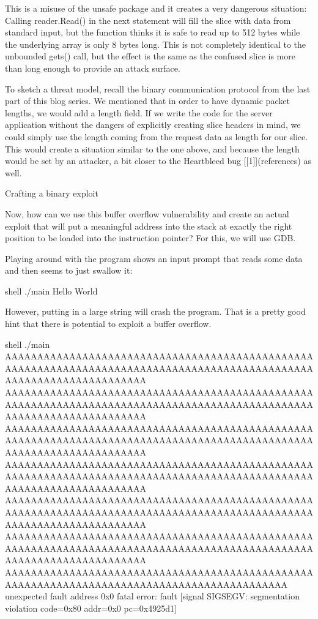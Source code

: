 This is a misuse of the unsafe package and it creates a very dangerous situation: Calling reader.Read() in the next
statement will fill the slice with data from standard input, but the function thinks it is safe to read up to 512 bytes
while the underlying array is only 8 bytes long. This is not completely identical to the unbounded gets() call,
but the effect is the same as the confused slice is more than long enough to provide an attack surface.

To sketch a threat model, recall the binary communication protocol from the last part of this blog series. We mentioned
that in order to have dynamic packet lengths, we would add a length field. If we write the code for the server application
without the dangers of explicitly creating slice headers in mind, we could simply use the length coming from the request
data as length for our slice. This would create a situation similar to the one above, and because the length would be
set by an attacker, a bit closer to the Heartbleed bug [[1]](references) as well.


Crafting a binary exploit

Now, how can we use this buffer overflow vulnerability and create an actual exploit that will put a meaningful address
into the stack at exactly the right position to be loaded into the instruction pointer? For this, we will use GDB.

Playing around with the program shows an input prompt that reads some data and then seems to just swallow it:

shell
./main
Hello World



However, putting in a large string will crash the program. That is a pretty good hint that there is potential to
exploit a buffer overflow.

shell
./main
AAAAAAAAAAAAAAAAAAAAAAAAAAAAAAAAAAAAAAAAAAAAAAAAAAAAAAAAAAAAAAAAAAAAAAAAAAAAAAAAAAAAAAAAAAAAAAAAAAAAAAAAAAAAAAAAAAAAAA
AAAAAAAAAAAAAAAAAAAAAAAAAAAAAAAAAAAAAAAAAAAAAAAAAAAAAAAAAAAAAAAAAAAAAAAAAAAAAAAAAAAAAAAAAAAAAAAAAAAAAAAAAAAAAAAAAAAAAA
AAAAAAAAAAAAAAAAAAAAAAAAAAAAAAAAAAAAAAAAAAAAAAAAAAAAAAAAAAAAAAAAAAAAAAAAAAAAAAAAAAAAAAAAAAAAAAAAAAAAAAAAAAAAAAAAAAAAAA
AAAAAAAAAAAAAAAAAAAAAAAAAAAAAAAAAAAAAAAAAAAAAAAAAAAAAAAAAAAAAAAAAAAAAAAAAAAAAAAAAAAAAAAAAAAAAAAAAAAAAAAAAAAAAAAAAAAAAA
AAAAAAAAAAAAAAAAAAAAAAAAAAAAAAAAAAAAAAAAAAAAAAAAAAAAAAAAAAAAAAAAAAAAAAAAAAAAAAAAAAAAAAAAAAAAAAAAAAAAAAAAAAAAAAAAAAAAAA
AAAAAAAAAAAAAAAAAAAAAAAAAAAAAAAAAAAAAAAAAAAAAAAAAAAAAAAAAAAAAAAAAAAAAAAAAAAAAAAAAAAAAAAAAAAAAAAAAAAAAAAAAAAAAAAAAAAAAA
AAAAAAAAAAAAAAAAAAAAAAAAAAAAAAAAAAAAAAAAAAAAAAAAAAAAAAAAAAAAAAAAAAAAAAAAAAAAAAAAAAAAAAAAAAAA
unexpected fault address 0x0
fatal error: fault
[signal SIGSEGV: segmentation violation code=0x80 addr=0x0 pc=0x4925d1]

